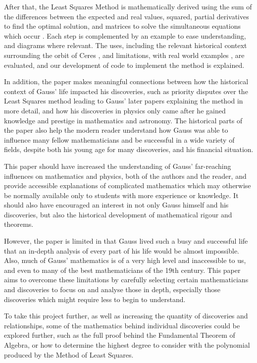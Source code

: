 \documentclass{article}
\begin{document}
After that, the Least Squares Method is mathematically derived using the sum of the differences between the expected and real values, squared, partial derivatives to find the optimal solution, and matrices to solve the simultaneous equations which occur \cite{eliminationmethod}. Each step is complemented by an example to ease understanding, and diagrams where relevant. The uses, including the relevant historical context surrounding the orbit of Ceres \cite{sea}, and limitations, with real world examples \cite{flaws}, are evaluated, and our development of code to implement the method is explained.

In addition, the paper makes meaningful connections between how the historical context of Gauss' life impacted his discoveries, such as priority disputes over the Least Squares method leading to Gauss' later papers explaining the method in more detail, and how his discoveries in physics only came after he gained knowledge and prestige in mathematics and astronomy. The historical parts of the paper also help the modern reader understand how Gauss was able to influence many fellow mathematicians and be successful in a wide variety of fields, despite both his young age for many discoveries, and his financial situation.

This paper should have increased the understanding of Gauss' far-reaching influences on mathematics and physics, both of the authors and the reader, and provide accessible explanations of complicated mathematics which may otherwise be normally available only to students with more experience or knowledge. It should also have encouraged an interest in not only Gauss himself and his discoveries, but also the historical development of mathematical rigour and theorems.

However, the paper is limited in that Gauss lived such a busy and successful life that an in-depth analysis of every part of his life would be almost impossible. Also, much of Gauss' mathematics is of a very high level and inaccessible to us, and even to many of the best mathematicians of the 19th century. This paper aims to overcome these limitations by carefully selecting certain mathematicians and discoveries to focus on and analyse those in depth, especially those discoveries which might require less to begin to understand.

To take this project further, as well as increasing the quantity of discoveries and relationships, some of the mathematics behind individual discoveries could be explored further, such as the full proof behind the Fundamental Theorem of Algebra, or how to determine the highest degree to consider with the polynomial produced by the Method of Least Squares.
\end{document}
